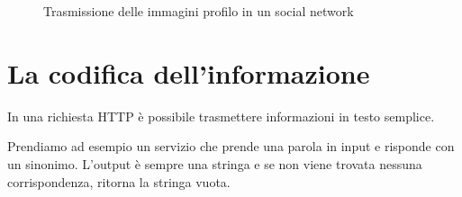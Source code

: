 \begin{figure}[!ht]
\begin{center}
    \qquad {}
    
\end{center}
\caption{Trasmissione delle immagini profilo in un social network}
\label{fig:immagini social}
\end{figure}
\newpage

\section{La codifica dell'informazione}
In una richiesta HTTP è possibile trasmettere informazioni in testo semplice. 

Prendiamo ad esempio un servizio che prende una parola in input e risponde con un sinonimo.
L'output è sempre una stringa e se non viene trovata nessuna corrispondenza, ritorna la stringa vuota.

